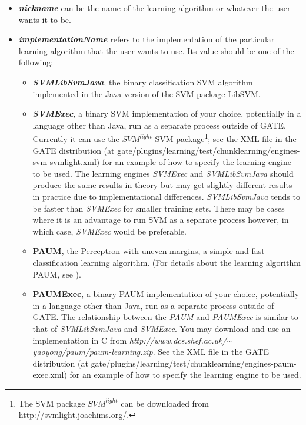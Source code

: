 \begin{itemize}

\item {\em {\bf nickname}} can be the name of the learning algorithm or whatever
the user wants it to be.

\item {\em {\bf implementationName}} refers to the implementation of the
particular learning algorithm that the user wants to use. Its value should be one of the
following:

\begin{itemize}

\item {\em {\bf SVMLibSvmJava}}, the binary classification SVM algorithm
implemented in the Java version of the SVM package LibSVM.

\item {\em {\bf SVMExec}}, a binary SVM implementation of your choice,
potentially in a language other than Java, run as a separate process outside of
GATE. Currently it can use the {\em $SVM^{light}$} SVM package\footnote{The SVM
package {\em $SVM^{light}$} can be downloaded from
http://svmlight.joachims.org/.}; see the XML file in the GATE distribution (at
 gate/plugins/learning/test/chunklearning/engines-svm-svmlight.xml) for an
 example of how to specify the learning engine to be used. The learning engines
 {\em SVMExec} and {\em SVMLibSvmJava} should produce the same results in theory
 but may get slightly different results in practice due to implementational
 differences. {\em SVMLibSvmJava} tends to be faster than {\em SVMExec} for
 smaller training sets. There may be cases where it is an advantage to run SVM as
 a separate process however, in which case, {\em SVMExec} would be preferable.

\item {\bf PAUM}, the Perceptron with uneven margins, a simple and fast
classification learning algorithm. (For details about the learning algorithm
PAUM, see \cite{Yaoyong02a}).

\item {\bf PAUMExec}, a binary PAUM implementation of your choice, potentially in
a language other than Java, run as a separate process outside of GATE. The
relationship between the {\em PAUM} and {\em PAUMExec} is similar to that of
{\em SVMLibSvmJava} and {\em SVMExec}. You may download and use an
implementation in C from {\em http://www.dcs.shef.ac.uk/$\sim$yaoyong/paum/paum-learning.zip}. See the XML
 file in the GATE distribution (at
 gate/plugins/learning/test/chunklearning/engines-paum-exec.xml) for an example
 of how to specify the learning engine to be used.


\end{itemize}
\end{itemize}
